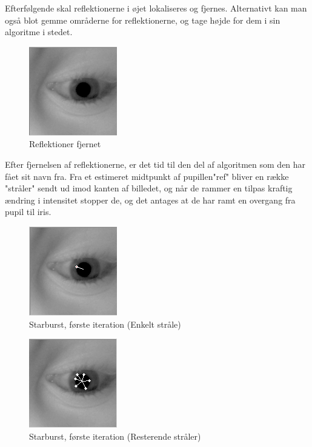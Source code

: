 \documentclass[rapport.tex]{subfiles}
\begin{document}
	Efterfølgende skal reflektionerne i øjet lokaliseres og fjernes. Alternativt kan man også blot gemme områderne for reflektionerne, og tage højde for dem i sin algoritme i stedet.
	
	\begin{figure}
	\centering
	\includegraphics[width=0.4\linewidth]{Billeder/CroppedEye,Reflectionremoved.png}
	\caption{Reflektioner fjernet}
	\label{fig:CroppedEye,Reflectionremoved}
	\end{figure}
	
	Efter fjernelsen af reflektionerne, er det tid til den del af algoritmen som den har fået sit navn fra. Fra et estimeret midtpunkt af pupillen"ref" bliver en række "stråler" sendt ud imod kanten af billedet, og når de rammer en tilpas kraftig ændring i intensitet stopper de, og det antages at de har ramt en overgang fra pupil til iris.
		
	\begin{figure}
	\raggedright
	\includegraphics[width=0.4\linewidth]{Billeder/Starburst,Firstsingle.png}
	\caption{Starburst, første iteration (Enkelt stråle)}
	\label{fig:Starburst,Firstsingle}
	\end{figure}	
		
	\begin{figure}
	\raggedleft
	\includegraphics[width=0.4\linewidth]{Billeder/Starburst,First.png}
	\caption{Starburst, første iteration (Resterende stråler)}
	\label{fig:Starburst,First}
	\end{figure}
	
\end{document}
